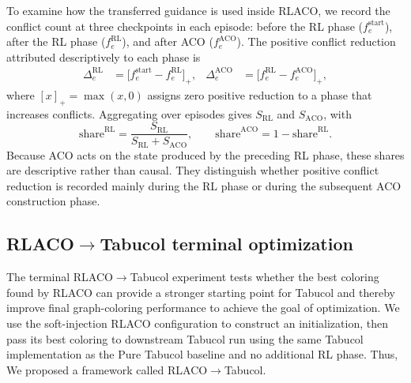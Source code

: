To examine how the transferred guidance is used inside RLACO, we record the conflict count at three checkpoints in each episode: before the RL phase ($f_e^{\mathrm{start}}$), after the RL phase ($f_e^{\mathrm{RL}}$), and after ACO ($f_e^{\mathrm{ACO}}$). The positive conflict reduction attributed descriptively to each phase is
\begin{align}
  \Delta_e^{\mathrm{RL}}
  &=
  \bigl[f_e^{\mathrm{start}} - f_e^{\mathrm{RL}}\bigr]_+,
  &
  \Delta_e^{\mathrm{ACO}}
  &=
  \bigl[f_e^{\mathrm{RL}} - f_e^{\mathrm{ACO}}\bigr]_+,
\end{align}
where $[x]_+=\max(x,0)$ assigns zero positive reduction to a phase that increases conflicts. Aggregating over episodes gives $S_{\mathrm{RL}}$ and $S_{\mathrm{ACO}}$, with
\begin{equation}
  \mathrm{share}^{\mathrm{RL}}
  =
  \frac{S_{\mathrm{RL}}}
       {S_{\mathrm{RL}}+S_{\mathrm{ACO}}},
  \qquad
  \mathrm{share}^{\mathrm{ACO}}
  = 1 - \mathrm{share}^{\mathrm{RL}}.
  \label{eq:phase-share}
\end{equation}
Because ACO acts on the state produced by the preceding RL phase, these shares are descriptive rather than causal. They distinguish whether positive conflict reduction is recorded mainly during the RL phase or during the subsequent ACO construction phase.

\subsection{RLACO$\rightarrow$Tabucol terminal optimization}
\label{ssec:terminal-method}

The terminal RLACO$\rightarrow$Tabucol experiment tests whether the best coloring found by RLACO can provide a stronger starting point for Tabucol and thereby improve final graph-coloring performance to achieve the goal of optimization. We use the soft-injection RLACO configuration to construct an initialization, then pass its best coloring to downstream Tabucol run using the same Tabucol implementation as the Pure Tabucol baseline and no additional RL phase. Thus, We proposed a framework called RLACO$\rightarrow$Tabucol.
